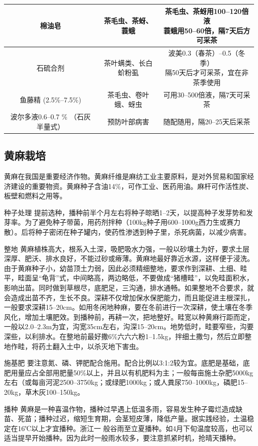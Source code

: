 \documentclass{ctexbook}
\begin{document}
\begin{table}[htbp]
\begin{tabular}{c|c|c}
		\hline
		棉油皂   & 茶毛虫、茶蚜、蓑蛾 & \thead{茶毛虫、茶蚜用100--120倍液\\蓑蛾用50--60倍，隔7天后方可采茶} \\
		\hline
		石硫合剂  & 茶叶螨类、长白蚧粉虱 & \thead{波美0.3（春茶）--0.5（冬季）\\隔50天后才可采茶，宜在非茶季使用} \\
		\hline
		鱼藤精 (2.5\%--7.5\%) & 茶毛虫、卷叶蛾、蚜虫 & 可用30--500倍液，隔7天可采茶 \\
		\hline
		波尔多液0.6--0.7 \% （石灰半量式） & 预防叶部病害 & 随配随用，隔20--25天后采茶 \\
		\hline
	\end{tabular}%
	\label{tab:chayuannongyao}%
\end{table}%
\subsection{黄麻栽培}
黄麻在我国是重要经济作物。黄麻纤维是麻纺工业主要原料，是对外贸易和国家经济建设的重要物资。黄麻种子含油14\%，可作工业、医药用油。麻杆可作活性炭、板壁和燃料之用等。

种子处理 提前选种，播种前半个月左右将种子晾晒1--2天，以提高种子发芽势和发芽率。为了避免种子带菌，用药剂拌种（100kg种子用600--1000g西力生或赛力散）。后将种子密闭在种子罐内，使药性渗透到种子里，杀死病菌，以减少病害。

整地 黄麻植株高大，根系入土深，吸肥吸水力强，一般以砂壤土为好，要求土层深厚、肥沃、排水良好，不能过砂或瘠薄。黄麻地最好靠近水源，这样便于浸洗。由于黄麻种子小，幼苗顶土力弱，因此必须精细整地，要求作到深耕、土细、畦平，畦面呈“龟背”式，中间略高，两边略低，不要做成“猪槽畦”，以免畦面积水，影响出苗。同时做到草根尽，底肥足，三沟通，排水通畅。如果整地不合要求，就会造成出苗不齐，生长不良。深耕不仅增加保水保肥能力，而且能促进主根深扎，一般要求深耕15--20cm。如用冬闲地种麻，要在冬前进行一次深耕，使土壤在冬季风化，增加土壤肥效。到播种前，再耕一次，把地整好。畦宽以种黄麻行距而定，一般以2.0--2.3m为宜，沟宽35cm左右，沟深15--20cm。地势低时，畦要窄些，沟要深些，以利排水。在整地前最好撒6\%六六六粉1--1.5kg，拌细土撒匀，然后立即整地作畦，将药土翻入土中，以杀灭地下害虫。

施基肥 要注意氮、磷、钾肥配合施用。配合比例以3:1:2较为宜。底肥是基础，底肥用量应占全部用肥量50\%以上，并且以有机肥料为主；一般每亩施土杂肥5000kg左右（或每亩河泥2500--3750kg；或绿肥1000kg；或人粪尿750--1000kg，磷肥15--20kg，草木灰100--150kg。

播种 黄麻是一种喜温作物，播种过早遇上低温多雨，容易发生种子霉烂造成缺苗、死苗；播种过迟，缩短生育期，会茎短皮薄，降低产量。据实践经验，土温稳定在16℃以上才宜播种。浙江一
般谷雨至立夏播种。如4月下旬温度较高，也可以适当提早开始播种。因为此时一般雨水较多，要注意抓紧时机，抢晴天播种。
\end{document}
